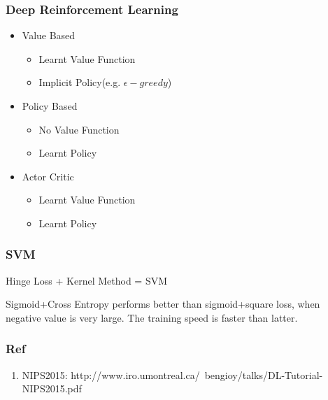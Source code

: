 \begin{frame}[fragile]
  \frametitle{Deep Reinforcement Learning}
  \begin{itemize}
  \item Value Based
    \begin{itemize}
    \item Learnt Value Function
    \item Implicit Policy(e.g. $\epsilon - greedy$)
    \end{itemize}
  \item Policy Based
    \begin{itemize}
    \item No Value Function
    \item Learnt Policy
    \end{itemize}
  \item Actor Critic
    \begin{itemize}
    \item Learnt Value Function
    \item Learnt Policy
    \end{itemize}
  \end{itemize}
\end{frame}

\begin{frame}[fragile]
  \frametitle{SVM}
  Hinge Loss + Kernel Method = SVM

  Sigmoid+Cross Entropy performs better than sigmoid+square loss, when negative
  value is very large. The training speed is faster than latter.
\end{frame}

\begin{frame}[fragile]
  \frametitle{Ref}
  \begin{enumerate}
    Machine Learning: Extract information from data for making better decisions.

    Deep learning: finding a fuction to map features to labels.
    
  \item NIPS2015: http://www.iro.umontreal.ca/~bengioy/talks/DL-Tutorial-NIPS2015.pdf
  \end{enumerate}
\end{frame}